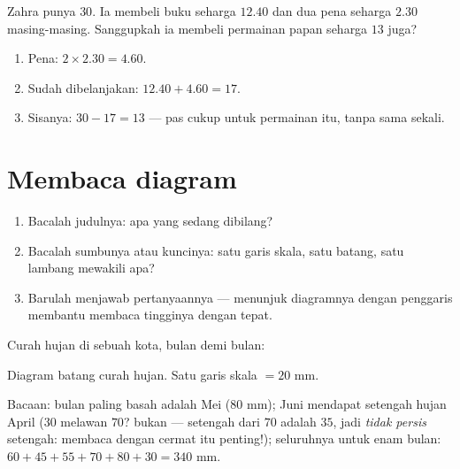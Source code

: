 \begin{example}\label{ex:g5:data:budget}
Zahra punya $30$. Ia membeli buku seharga $12.40$ dan dua pena
seharga $2.30$ masing-masing. Sanggupkah ia membeli permainan papan seharga $13$ juga?
\begin{enumerate}
  \item Pena: $2 \times 2.30 = 4.60$.
  \item Sudah dibelanjakan: $12.40 + 4.60 = 17$.
  \item Sisanya: $30 - 17 = 13$ --- pas cukup untuk permainan itu,
        tanpa  sama sekali.
\end{enumerate}
\end{example}

\section{Membaca diagram}

\begin{method}\label{met:g5:data:read}
\begin{enumerate}
  \item Bacalah judulnya: apa yang sedang dibilang?
  \item Bacalah sumbunya atau kuncinya: satu garis skala, satu
        batang, satu lambang mewakili apa?
  \item Barulah menjawab pertanyaannya --- menunjuk diagramnya
        dengan penggaris membantu membaca tingginya dengan tepat.
\end{enumerate}
\end{method}

\begin{example}\label{ex:g5:data:chart}
Curah hujan di sebuah kota, bulan demi bulan:

\begin{omfigure}

{\small Diagram batang curah hujan. Satu garis skala $= 20$ mm.}
\end{omfigure}

Bacaan: bulan paling basah adalah Mei ($80$ mm); Juni mendapat
setengah hujan April ($30$ melawan $70$? bukan --- setengah dari
$70$ adalah $35$, jadi \emph{tidak persis} setengah: membaca dengan
cermat itu penting!); seluruhnya untuk enam bulan:
$60 + 45 + 55 + 70 + 80 + 30 = 340$ mm.
\end{example}

